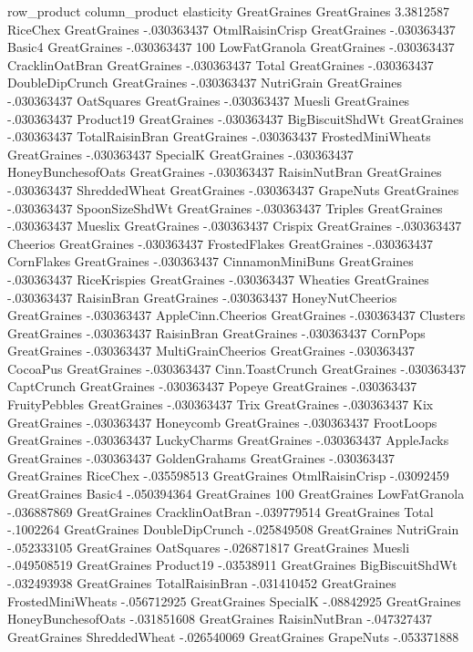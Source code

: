 row_product	column_product	elasticity
GreatGraines	GreatGraines	3.3812587
RiceChex	GreatGraines	-.030363437
OtmlRaisinCrisp	GreatGraines	-.030363437
Basic4	GreatGraines	-.030363437
100%
LowFatGranola	GreatGraines	-.030363437
CracklinOatBran	GreatGraines	-.030363437
Total	GreatGraines	-.030363437
DoubleDipCrunch	GreatGraines	-.030363437
NutriGrain	GreatGraines	-.030363437
OatSquares	GreatGraines	-.030363437
Muesli	GreatGraines	-.030363437
Product19	GreatGraines	-.030363437
BigBiscuitShdWt	GreatGraines	-.030363437
TotalRaisinBran	GreatGraines	-.030363437
FrostedMiniWheats	GreatGraines	-.030363437
SpecialK	GreatGraines	-.030363437
HoneyBunchesofOats	GreatGraines	-.030363437
RaisinNutBran	GreatGraines	-.030363437
ShreddedWheat	GreatGraines	-.030363437
GrapeNuts	GreatGraines	-.030363437
SpoonSizeShdWt	GreatGraines	-.030363437
Triples	GreatGraines	-.030363437
Mueslix	GreatGraines	-.030363437
Crispix	GreatGraines	-.030363437
Cheerios	GreatGraines	-.030363437
FrostedFlakes	GreatGraines	-.030363437
CornFlakes	GreatGraines	-.030363437
CinnamonMiniBuns	GreatGraines	-.030363437
RiceKrispies	GreatGraines	-.030363437
Wheaties	GreatGraines	-.030363437
RaisinBran	GreatGraines	-.030363437
HoneyNutCheerios	GreatGraines	-.030363437
AppleCinn.Cheerios	GreatGraines	-.030363437
Clusters	GreatGraines	-.030363437
RaisinBran	GreatGraines	-.030363437
CornPops	GreatGraines	-.030363437
MultiGrainCheerios	GreatGraines	-.030363437
CocoaPus	GreatGraines	-.030363437
Cinn.ToastCrunch	GreatGraines	-.030363437
CaptCrunch	GreatGraines	-.030363437
Popeye	GreatGraines	-.030363437
FruityPebbles	GreatGraines	-.030363437
Trix	GreatGraines	-.030363437
Kix	GreatGraines	-.030363437
Honeycomb	GreatGraines	-.030363437
FrootLoops	GreatGraines	-.030363437
LuckyCharms	GreatGraines	-.030363437
AppleJacks	GreatGraines	-.030363437
GoldenGrahams	GreatGraines	-.030363437
GreatGraines	RiceChex	-.035598513
GreatGraines	OtmlRaisinCrisp	-.03092459
GreatGraines	Basic4	-.050394364
GreatGraines	100%
GreatGraines	LowFatGranola	-.036887869
GreatGraines	CracklinOatBran	-.039779514
GreatGraines	Total	-.1002264
GreatGraines	DoubleDipCrunch	-.025849508
GreatGraines	NutriGrain	-.052333105
GreatGraines	OatSquares	-.026871817
GreatGraines	Muesli	-.049508519
GreatGraines	Product19	-.03538911
GreatGraines	BigBiscuitShdWt	-.032493938
GreatGraines	TotalRaisinBran	-.031410452
GreatGraines	FrostedMiniWheats	-.056712925
GreatGraines	SpecialK	-.08842925
GreatGraines	HoneyBunchesofOats	-.031851608
GreatGraines	RaisinNutBran	-.047327437
GreatGraines	ShreddedWheat	-.026540069
GreatGraines	GrapeNuts	-.053371888
